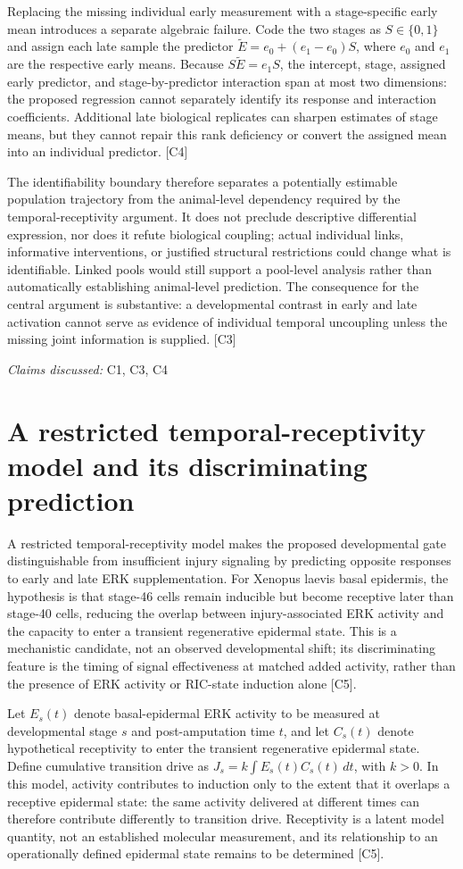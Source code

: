 \documentclass[11pt]{article}
\begin{document}
Replacing the missing individual early measurement with a stage-specific early mean introduces a separate algebraic failure. Code the two stages as $S\in\{0,1\}$ and assign each late sample the predictor $\widetilde E=e_0+(e_1-e_0)S$, where $e_0$ and $e_1$ are the respective early means. Because $S\widetilde E=e_1S$, the intercept, stage, assigned early predictor, and stage-by-predictor interaction span at most two dimensions: the proposed regression cannot separately identify its response and interaction coefficients. Additional late biological replicates can sharpen estimates of stage means, but they cannot repair this rank deficiency or convert the assigned mean into an individual predictor. [C4]

The identifiability boundary therefore separates a potentially estimable population trajectory from the animal-level dependency required by the temporal-receptivity argument. It does not preclude descriptive differential expression, nor does it refute biological coupling; actual individual links, informative interventions, or justified structural restrictions could change what is identifiable. Linked pools would still support a pool-level analysis rather than automatically establishing animal-level prediction. The consequence for the central argument is substantive: a developmental contrast in early and late activation cannot serve as evidence of individual temporal uncoupling unless the missing joint information is supplied. [C3]

\textit{Claims discussed: }C1, C3, C4
\section{A restricted temporal-receptivity model and its discriminating prediction}
A restricted temporal-receptivity model makes the proposed developmental gate distinguishable from insufficient injury signaling by predicting opposite responses to early and late ERK supplementation. For Xenopus laevis basal epidermis, the hypothesis is that stage-46 cells remain inducible but become receptive later than stage-40 cells, reducing the overlap between injury-associated ERK activity and the capacity to enter a transient regenerative epidermal state. This is a mechanistic candidate, not an observed developmental shift; its discriminating feature is the timing of signal effectiveness at matched added activity, rather than the presence of ERK activity or RIC-state induction alone [C5].

Let $E_s(t)$ denote basal-epidermal ERK activity to be measured at developmental stage $s$ and post-amputation time $t$, and let $C_s(t)$ denote hypothetical receptivity to enter the transient regenerative epidermal state. Define cumulative transition drive as $J_s=k\int E_s(t)C_s(t)\,dt$, with $k>0$. In this model, activity contributes to induction only to the extent that it overlaps a receptive epidermal state: the same activity delivered at different times can therefore contribute differently to transition drive. Receptivity is a latent model quantity, not an established molecular measurement, and its relationship to an operationally defined epidermal state remains to be determined [C5].
\end{document}
